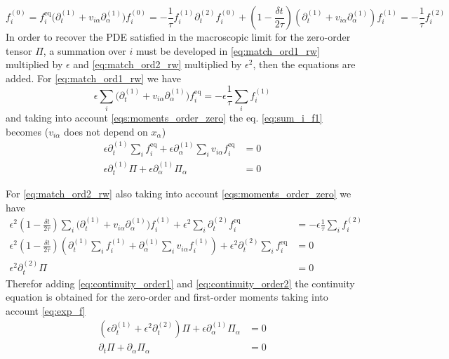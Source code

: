 \begin{subequations}\label{eqs:match_orders_rewrite}
\begin{equation}\label{eq:match_ord0_rw}
    f_i^{(0)} = f_i^{\text{eq}}
\end{equation}
\begin{equation}\label{eq:match_ord1_rw}
    \bigg(\partial_t^{(1)}+v_{i\alpha}\partial_\alpha^{(1)}\bigg)f_i^{(0)} = -\frac{1}{\tau}f_i^{(1)}
\end{equation}
\begin{equation}\label{eq:match_ord2_rw}
    \partial_t^{(2)}f_i^{(0)}+\left(1-\frac{\delta t}{2\tau}\right)\left(\partial_t^{(1)}+v_{i\alpha}\partial_{\alpha}^{(1)}\right)f_i^{(1)} =  -\frac{1}{\tau}f_i^{(2)}
\end{equation}
\end{subequations}
In order to recover the PDE satisfied in the macroscopic limit for the zero-order tensor $\Pi$, a summation over $i$ must be developed in \ref{eq:match_ord1_rw} multiplied by $\epsilon$ and \ref{eq:match_ord2_rw} multiplied by $\epsilon^2$, then the equations are added. For \ref{eq:match_ord1_rw} we have 
\begin{equation}\label{eq:sum_i_f1}
    \epsilon\sum_i\bigg(\partial_t^{(1)}+v_{i\alpha}\partial_\alpha^{(1)}\bigg)f_i^{\text{eq}} = -\epsilon\frac{1}{\tau}\sum_if_i^{(1)}
\end{equation}
and taking into account \ref{eqs:moments_order_zero} the eq. \ref{eq:sum_i_f1} becomes ($v_{i\alpha}$ does not depend on $x_\alpha$)
\begin{align}\label{eq:continuity_order1}
    \epsilon\partial_t^{(1)}\sum_if_i^{\text{eq}}+\epsilon\partial_\alpha^{(1)}\sum_iv_{i\alpha}f_i^{\text{eq}} &= 0 \nonumber\\
    \epsilon\partial_t^{(1)}\Pi + \epsilon\partial_\alpha^{(1)}\Pi_{\alpha} &= 0
\end{align}

For \ref{eq:match_ord2_rw} also taking into account \ref{eqs:moments_order_zero} we have
\begin{align}\label{eq:continuity_order2}
    \epsilon^2\left(1-\frac{\delta t}{2\tau}\right)\sum_i\bigg(\partial_t^{(1)}+v_{i\alpha}\partial_\alpha^{(1)}\bigg)f_i^{(1)} + \epsilon^2\sum_i\partial_{t}^{(2)}f_i^{\text{eq}} &= -\epsilon\frac{1}{\tau}\sum_if_i^{(2)} \nonumber\\
    \epsilon^2\left(1-\frac{\delta t}{2\tau}\right)\left(\partial_t^{(1)}\sum_if_i^{(1)}+\partial_\alpha^{(1)}\sum_iv_{i\alpha}f_i^{(1)}\right) + \epsilon^2\partial_{t}^{(2)}\sum_if_i^{\text{eq}} &= 0 \nonumber\\
    \epsilon^2\partial_{t}^{(2)}\Pi &= 0
\end{align}
Therefor adding \ref{eq:continuity_order1} and \ref{eq:continuity_order2} the continuity equation is obtained for the zero-order and first-order moments taking into account \ref{eq:exp_f}
\begin{align}\label{eq:escalar_continuity}
    \left(\epsilon\partial_t^{(1)} + \epsilon^2\partial_t^{(2)}\right)\Pi + \epsilon\partial_\alpha^{(1)}\Pi_{\alpha} &= 0 \nonumber\\
    \partial_t\Pi + \partial_\alpha\Pi_\alpha &= 0
\end{align}

